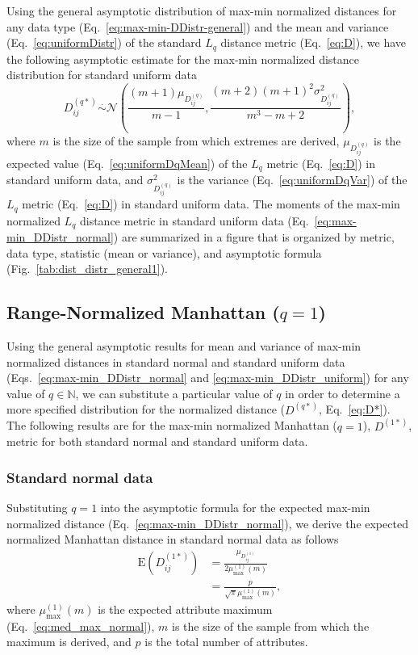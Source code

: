 \documentclass[10pt,letterpaper]{article}
\begin{document}
Using the general asymptotic distribution of max-min normalized distances for any data type (Eq.~\ref{eq:max-min-DDistr-general}) and the mean and variance (Eq.~\ref{eq:uniformDistr}) of the standard $L_q$ distance metric (Eq.~\ref{eq:D}), we have the following asymptotic estimate for the max-min normalized distance distribution for standard uniform data
%
\begin{equation}\label{eq:max-min_DDistr_uniform}
D^{(q*)}_{ij} \overset{.}{\sim} \mathcal{N}\left(\frac{(m+1)\mu_{D^{(q)}_{ij}}}{m-1}, \frac{(m+2)(m+1)^2 \sigma^2_{D^{(q)}_{ij}}}{m^3 - m + 2}\right),
\end{equation}
%
where $m$ is the size of the sample from which extremes are derived, $\mu_{D^{(q)}_{ij}}$ is the expected value (Eq.~\ref{eq:uniformDqMean}) of the $L_q$ metric (Eq.~\ref{eq:D}) in standard uniform data, and $\sigma^2_{D^{(q)}_{ij}}$ is the variance (Eq.~\ref{eq:uniformDqVar}) of the $L_q$ metric (Eq.~\ref{eq:D}) in standard uniform data. The moments of the max-min normalized $L_q$ distance metric in standard uniform data (Eq.~\ref{eq:max-min_DDistr_normal}) are summarized in a figure that is organized by metric, data type, statistic (mean or variance), and asymptotic formula (Fig.~\ref{tab:dist_distr_general1}).

\subsection*{Range-Normalized Manhattan \texorpdfstring{($q=1$)}{}}

Using the general asymptotic results for mean and variance of max-min normalized distances in standard normal and standard uniform data (Eqs.~\ref{eq:max-min_DDistr_normal} and \ref{eq:max-min_DDistr_uniform}) for any value of $q \in \mathbb{N}$, we can substitute a particular value of $q$ in order to determine a more specified distribution for the normalized distance ($D^{(q*)}$, Eq.~\ref{eq:D*}). The following results are for the max-min normalized Manhattan ($q = 1$), $D^{(1*)}$, metric for both standard normal and standard uniform data.

\subsubsection*{Standard normal data}

Substituting $q=1$ into the asymptotic formula for the expected max-min normalized distance (Eq.~\ref{eq:max-min_DDistr_normal}), we derive the expected normalized Manhattan distance in standard normal data as follows
%
\begin{equation}\label{eq:max-min_mean_normal_manhattan}
\begin{aligned}
\text{E}\left(D^{(1*)}_{ij}\right) &= \frac{\mu_{D^{(1)}_{ij}}}{2\mu^{(1)}_\text{max}(m)} \\
&= \frac{p}{\sqrt{\pi}\mu^{(1)}_\text{max}(m)},
\end{aligned}
\end{equation}
%
where $\mu^{(1)}_\text{max}(m)$ is the expected attribute maximum (Eq.~\ref{eq:med_max_normal}), $m$ is the size of the sample from which the maximum is derived, and $p$ is the total number of attributes.
\end{document}
